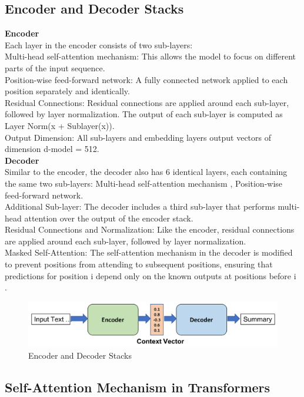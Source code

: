 \subsection{Encoder and Decoder Stacks}
\textbf{Encoder}\\ Each layer in the encoder consists of two sub-layers: \\
Multi-head self-attention mechanism: This allows the model to focus on different parts of the input sequence. \\
Position-wise feed-forward network: A fully connected network applied to each position separately and identically. \\
Residual Connections: Residual connections are applied around each sub-layer, followed by layer normalization. The output of each sub-layer is computed as Layer Norm(x + Sublayer(x)). \\
Output Dimension: All sub-layers and embedding layers output vectors of dimension d-model = 512.\\
\textbf{Decoder}\\ Similar to the encoder, the decoder also has 6 identical layers, each containing the same two sub-layers:
Multi-head self-attention mechanism ,
Position-wise feed-forward network. \\
Additional Sub-layer: The decoder includes a third sub-layer that performs multi-head attention over the output of the encoder stack. \\
Residual Connections and Normalization: Like the encoder, residual connections are applied around each sub-layer, followed by layer normalization. \\
Masked Self-Attention: The self-attention mechanism in the decoder is modified to prevent positions from attending to subsequent positions, ensuring that predictions for position i depend only on the known outputs at positions before i \cite{vaswani2017attention}.
\begin{figure}[htbp]
	
	\centerline{\includegraphics[width=.8\linewidth]{
			Figures/incoderDecoder.png}}
	\caption{Encoder and Decoder Stacks}
	\label{incoderDecoder.png}
	
\end{figure}
\subsection{Self-Attention Mechanism in Transformers}

